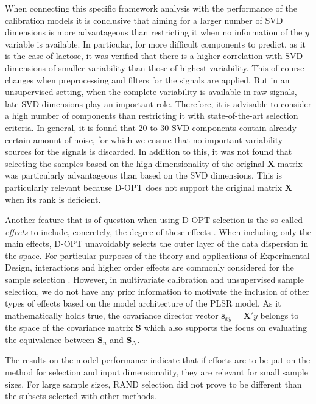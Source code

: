 \documentclass[journal=ancham,manuscript=article]{achemso}
\begin{document}
When connecting this specific framework analysis with the performance of the calibration models it is conclusive that aiming for a larger number of SVD dimensions is more advantageous than restricting it when no information of the $y$ variable is available. In particular, for more difficult components to predict, as it is the case of lactose, it was verified that there is a higher correlation with SVD dimensions of smaller variability than those of highest variability. This of course changes when preprocessing and filters for the signals are applied. But in an unsupervised setting, when the complete variability is available in raw signals, late SVD dimensions play an important role. Therefore, it is advisable to consider a high number of components than restricting it with state-of-the-art selection criteria. In general, it is found that 20 to 30 SVD components contain already certain amount of noise, for which we ensure that no important variability sources for the signals is discarded. In addition to this, it was not found that selecting the samples based on the high dimensionality of the original $\mathbf{X}$ matrix was particularly advantageous than based on the SVD dimensions. This is particularly relevant because D-OPT does not support the original matrix $\mathbf{X}$ when its rank is deficient.

Another feature that is of question when using D-OPT selection is the so-called \emph{effects} to include, concretely, the degree of these effects \cite{Goos2011}. When including only the main effects, D-OPT unavoidably selects the outer layer of the data dispersion in the space. For particular purposes of the theory and applications of Experimental Design, interactions and higher order effects are commonly considered for the sample selection \cite{Brandmaier2012}. However, in multivariate calibration and unsupervised sample selection, we do not have any prior information to motivate the inclusion of other types of effects based on the model architecture of the PLSR model. As it mathematically holds true, the covariance director vector $\mathbf{s}_{xy} = \mathbf{X}'y$ belongs to the space of the covariance matrix $\mathbf{S}$ which also supports the focus on evaluating the equivalence between $\mathbf{S}_n$ and $\mathbf{S}_N$. 

The results on the model performance indicate that if efforts are to be put on the method for selection and input dimensionality, they are relevant for small sample sizes. For large sample sizes, RAND selection did not prove to be different than the subsets selected with other methods.
\end{document}
